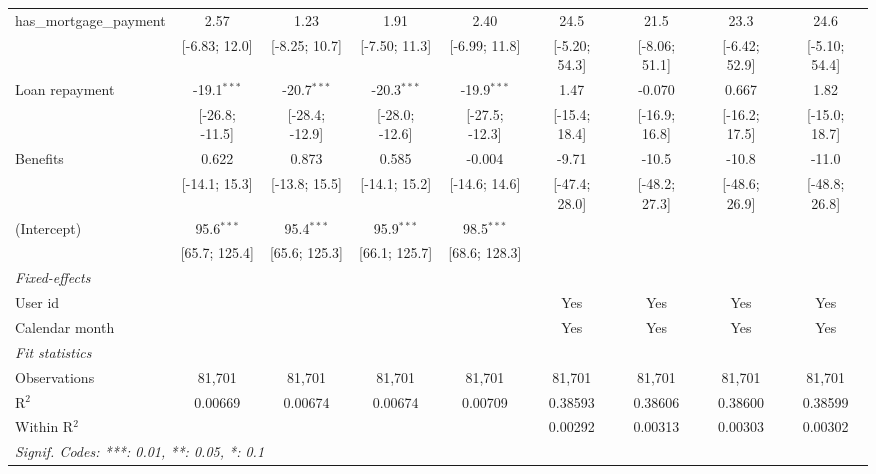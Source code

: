\begin{table}[htbp]
\begin{threeparttable}[b]
\begin{tabular}{lcccccccc}
         has\_mortgage\_payment   & 2.57           & 1.23           & 1.91           & 2.40           & 24.5            & 21.5            & 23.3            & 24.6\\   
                                  & [-6.83; 12.0]  & [-8.25; 10.7]  & [-7.50; 11.3]  & [-6.99; 11.8]  & [-5.20; 54.3]   & [-8.06; 51.1]   & [-6.42; 52.9]   & [-5.10; 54.4]\\   
         Loan repayment           & -19.1$^{***}$  & -20.7$^{***}$  & -20.3$^{***}$  & -19.9$^{***}$  & 1.47            & -0.070          & 0.667           & 1.82\\   
                                  & [-26.8; -11.5] & [-28.4; -12.9] & [-28.0; -12.6] & [-27.5; -12.3] & [-15.4; 18.4]   & [-16.9; 16.8]   & [-16.2; 17.5]   & [-15.0; 18.7]\\   
         Benefits                 & 0.622          & 0.873          & 0.585          & -0.004         & -9.71           & -10.5           & -10.8           & -11.0\\   
                                  & [-14.1; 15.3]  & [-13.8; 15.5]  & [-14.1; 15.2]  & [-14.6; 14.6]  & [-47.4; 28.0]   & [-48.2; 27.3]   & [-48.6; 26.9]   & [-48.8; 26.8]\\   
         (Intercept)              & 95.6$^{***}$   & 95.4$^{***}$   & 95.9$^{***}$   & 98.5$^{***}$   &                 &                 &                 &   \\   
                                  & [65.7; 125.4]  & [65.6; 125.3]  & [66.1; 125.7]  & [68.6; 128.3]  &                 &                 &                 &   \\   
         \midrule
         \emph{Fixed-effects}\\
         User id                  &                &                &                &                & Yes             & Yes             & Yes             & Yes\\  
         Calendar month           &                &                &                &                & Yes             & Yes             & Yes             & Yes\\  
         \midrule
         \emph{Fit statistics}\\
         Observations             & 81,701         & 81,701         & 81,701         & 81,701         & 81,701          & 81,701          & 81,701          & 81,701\\  
         R$^2$                    & 0.00669        & 0.00674        & 0.00674        & 0.00709        & 0.38593         & 0.38606         & 0.38600         & 0.38599\\  
         Within R$^2$             &                &                &                &                & 0.00292         & 0.00313         & 0.00303         & 0.00302\\  
         \midrule \midrule
         \multicolumn{9}{l}{\emph{Signif. Codes: ***: 0.01, **: 0.05, *: 0.1}}\\
      \end{tabular}
      

\end{threeparttable}
\end{table}
